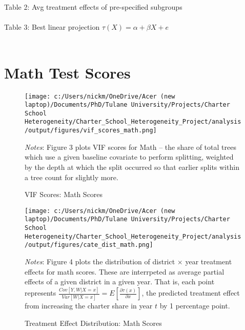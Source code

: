 \documentclass{article} %
\begin{document}
Table 2: Avg treatment effects of pre-specified subgroups\\
\\

Table 3: Best linear projection $\tau(X) = \alpha + \beta X + e$\\
\\




	\section{Math Test Scores}

\begin{figure}[H]
\centering
\texttt{[image: c:/Users/nickm/OneDrive/Acer (new laptop)/Documents/PhD/Tulane University/Projects/Charter School Heterogeneity/Charter\_School\_Heterogeneity\_Project/analysis/output/figures/vif\_scores\_math.png]}
\caption{VIF Scores: Math Scores}
\label{fig:image3}
\begin{minipage}{1\linewidth}
\singlespacing
\footnotesize
\emph{Notes}: Figure 3 plots VIF scores for Math -- the share of total trees which use a given baseline covariate to perform splitting, weighted by the depth at which the split occurred so that earlier splits within a tree count for slightly more.  
\end{minipage}
\end{figure}


\begin{figure}[H]
\centering
\texttt{[image: c:/Users/nickm/OneDrive/Acer (new laptop)/Documents/PhD/Tulane University/Projects/Charter School Heterogeneity/Charter\_School\_Heterogeneity\_Project/analysis/output/figures/cate\_dist\_math.png]}
\caption{Treatment Effect Distribution: Math Scores}
\label{fig:image4}
\begin{minipage}{1\linewidth}
\singlespacing
\footnotesize
\emph{Notes}: Figure 4 plots the distribution of district $\times$ year treatment effects for math scores. These are interrpeted as average partial effects of a given district in a given year. That is, each point represents $\frac{Cov[Y, W | X = x]}{Var[W | X = x]} = E\left[ \frac{\partial \tau(x)}{\partial x} \right]$, the predicted treatment effect from increasing the charter share in year $t$ by 1 percentage point.
\end{minipage}
\end{figure}
\end{document}

